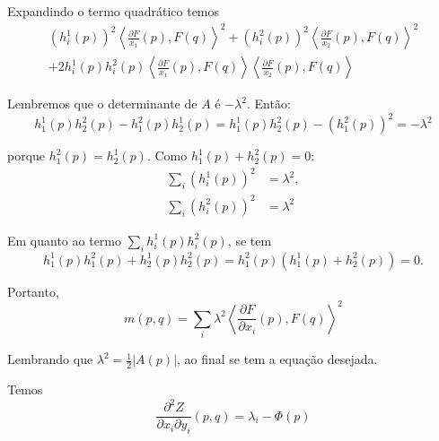 \begin{demonstracao}
	Expandindo o termo quadrático temos
	\begin{multline*}
		(h_i^1(p))^2 \left\langle \frac{\partial F}{x_1}(p), F(q) \right\rangle^2 + (h_i^2(p))^2 \left\langle \frac{\partial F}{x_2}(p), F(q) \right\rangle^2\\
		+ 2 h_i^1(p) h_i^2(p) \left\langle \frac{\partial F}{x_1}(p), F(q) \right\rangle \left\langle \frac{\partial F}{x_2}(p), F(q) \right\rangle
	\end{multline*}
	
	Lembremos que o determinante de $A$ é $-\lambda^2$. Então:
	\begin{equation*}
		h_1^1(p) h_2^2(p) - h_1^2(p) h_2^1(p) = h_1^1(p) h_2^2(p) - (h_1^2(p))^2 = -\lambda^2
	\end{equation*}
	
	porque $h_1^2(p) = h_2^1(p)$. Como $h_1^1(p) + h_2^2(p) = 0$:
	\begin{align*}
		\sum_i (h_i^1(p))^2 &= \lambda^2,\\
		\sum_i (h_i^2(p))^2 &= \lambda^2
	\end{align*}
	
	Em quanto ao termo $\sum_i h_i^1(p) h_i^2(p)$, se tem
	\begin{equation*}
		h_1^1(p) h_1^2(p) + h_2^1(p) h_2^2(p) = h_1^2(p) (h_1^1(p) + h_2^2(p)) = 0.
	\end{equation*}
	
	Portanto,
	\begin{equation*}
		m(p,q) = \sum_i \lambda^2 \left\langle \frac{\partial F}{\partial x_i}(p), F(q) \right\rangle^2
	\end{equation*}
	
	Lembrando que $\lambda^2 = \frac{1}{2} |A(p)|$, ao final se tem a equação desejada.
\end{demonstracao}


\begin{proposicao}
	Temos
	\begin{equation}\label{diff_Z_x_y}
		\frac{\partial^2 Z}{\partial x_i \partial y_i}(p,q) = \lambda_i - \Phi(p)
	\end{equation}
\end{proposicao}

